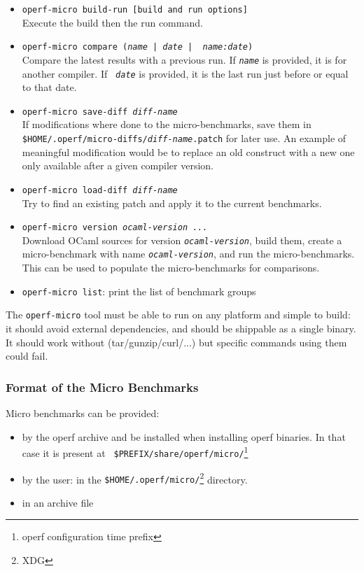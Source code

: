 \documentclass[11pt,a4paper]{article}
\begin{document}
\begin{itemize}
\item {\tt operf-micro build-run [build and run options]}\\
  Execute the build then the run command.
\item {\tt operf-micro compare {\tt ({\em name} | {\em date} | {\em
      name:date}) }}\\ Compare the latest results with a previous run.
  If {\tt\em name} is provided, it is for another compiler. If {\tt\em
    date} is provided, it is the last run just before or equal to that
  date.
\item {\tt operf-micro save-diff {\em diff-name}}\\
  If modifications where done to the micro-benchmarks, save them in
  {\tt \$HOME/.operf/micro-diffs/{\em diff-name}.patch} for later use.
  An example of meaningful modification would be to replace an old
  construct with a new one only available after a given compiler version.
\item  {\tt operf-micro load-diff {\em diff-name}}\\
  Try to find an existing patch and apply it to the current benchmarks.
\item {\tt operf-micro version {\em ocaml-version ...}}\\ Download OCaml
  sources for version {\tt\em ocaml-version}, build them, create a
  micro-benchmark with name {\tt\em ocaml-version}, and run the
  micro-benchmarks. This can be used to populate the micro-benchmarks
  for comparisons.
\item {\tt operf-micro list}: print the list of benchmark groups
\end{itemize}

The {\tt operf-micro} tool must be able to run on any platform and
simple to build: it should avoid external dependencies, and should be
shippable as a single binary. It should work without
(tar/gunzip/curl/...) but specific commands using them could fail.

\subsubsection{Format of the Micro Benchmarks}

Micro benchmarks can be provided:
\begin{itemize}
\item by the operf archive and be installed when installing operf
  binaries. In that case it is present at {\tt
    \$PREFIX/share/operf/micro/}\footnote{operf configuration time
    prefix}
\item by the user: in the {\tt \$HOME/.operf/micro/}\footnote{XDG}
  directory.
\item in an archive file
\end{itemize}
\end{document}
